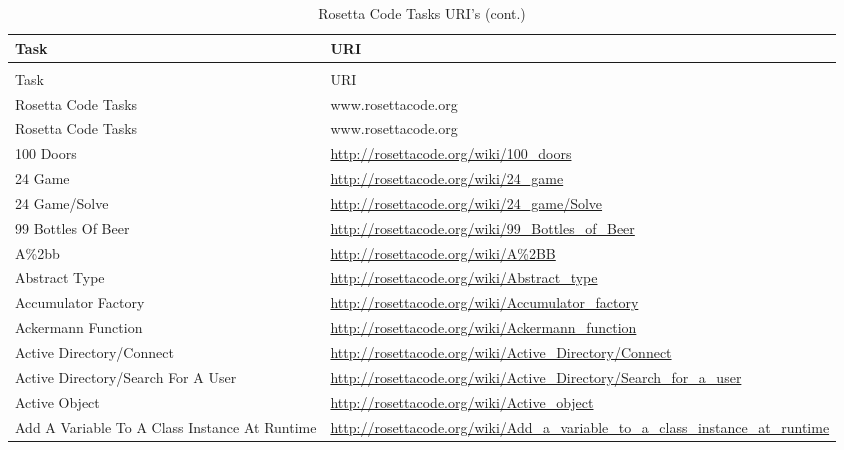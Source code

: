 \begin{landscape}

\begin{longtable}{ll}
\caption{URI's of Rosetta Code Tasks} \\
\hline
Task & URI \\
\hline\hline\endfirsthead
\caption{Rosetta Code Tasks URI's (cont.)}  \\
Task & URI \\
\hline\endhead
\hline
Rosetta Code Tasks & www.rosettacode.org \\
\hline\endfoot
\hline
Rosetta Code Tasks & www.rosettacode.org \\
\hline\endlastfoot

100 Doors & \href{http://rosettacode.org/wiki/100\_doors}{http://rosettacode.org/wiki/100\_doors} \\
24 Game & \href{http://rosettacode.org/wiki/24\_game}{http://rosettacode.org/wiki/24\_game} \\
24 Game/Solve & \href{http://rosettacode.org/wiki/24\_game/Solve}{http://rosettacode.org/wiki/24\_game/Solve} \\
99 Bottles Of Beer & \href{http://rosettacode.org/wiki/9\_Bottle\_o\_Beer}{http://rosettacode.org/wiki/99\_Bottles\_of\_Beer} \\
A\%2bb & \href{http://rosettacode.org/wiki/A\%2BB}{http://rosettacode.org/wiki/A\%2BB} \\

Abstract Type & \href{http://rosettacode.org/wiki/Abstrac\_type}{http://rosettacode.org/wiki/Abstract\_type} \\
Accumulator Factory & \href{http://rosettacode.org/wiki/Accumulato\_factory}{http://rosettacode.org/wiki/Accumulator\_factory} \\
Ackermann Function & \href{http://rosettacode.org/wiki/Ackerman\_function}{http://rosettacode.org/wiki/Ackermann\_function} \\

Active Directory/Connect & \href{http://rosettacode.org/wiki/Activ\_Directory/Connect}{http://rosettacode.org/wiki/Active\_Directory/Connect} \\
Active Directory/Search For A User & \href{http://rosettacode.org/wiki/Activ\_Directory/Searc\_fo\_\_user}{http://rosettacode.org/wiki/Active\_Directory/Search\_for\_a\_user} \\

Active Object & \href{http://rosettacode.org/wiki/Activ\_object}{http://rosettacode.org/wiki/Active\_object} \\
Add A Variable To A Class Instance At Runtime & \href{http://rosettacode.org/wiki/Ad\_\_variabl\_t\_\_clas\_instanc\_a\_runtime}{http://rosettacode.org/wiki/Add\_a\_variable\_to\_a\_class\_instance\_at\_runtime} \\


\end{longtable}
\end{landscape}
